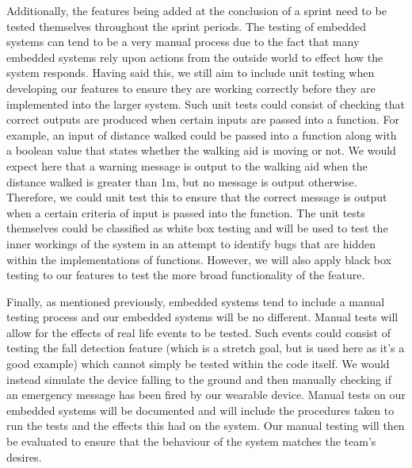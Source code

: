         Additionally, the features being added at the conclusion of a sprint need to be tested themselves throughout the sprint periods. The testing of embedded systems can tend to be a very manual process due to the fact that many embedded systems rely upon actions from the outside world to effect how the system responds. Having said this, we still aim to include unit testing when developing our features to ensure they are working correctly before they are implemented into the larger system. Such unit tests could consist of checking that correct outputs are produced when certain inputs are passed into a function. For example, an input of distance walked could be passed into a function along with a boolean value that states whether the walking aid is moving or not. We would expect here that a warning message is output to the walking aid when the distance walked is greater than 1m, but no message is output otherwise. Therefore, we could unit test this to ensure that the correct message is output when a certain criteria of input is passed into the function. The unit tests themselves could be classified as white box testing and will be used to test the inner workings of the system in an attempt to identify bugs that are hidden within the implementations of functions. However, we will also apply black box testing to our features to test the more broad functionality of the feature.

        Finally, as mentioned previously, embedded systems tend to include a manual testing process and our embedded systems will be no different. Manual tests will allow for the effects of real life events to be tested. Such events could consist of testing the fall detection feature (which is a stretch goal, but is used here as it's a good example) which cannot simply be tested within the code itself. We would instead simulate the device falling to the ground and then manually checking if an emergency message has been fired by our wearable device. Manual tests on our embedded systems will be documented and will include the procedures taken to run the tests and the effects this had on the system. Our manual testing will then be evaluated to ensure that the behaviour of the system matches the team's desires.
